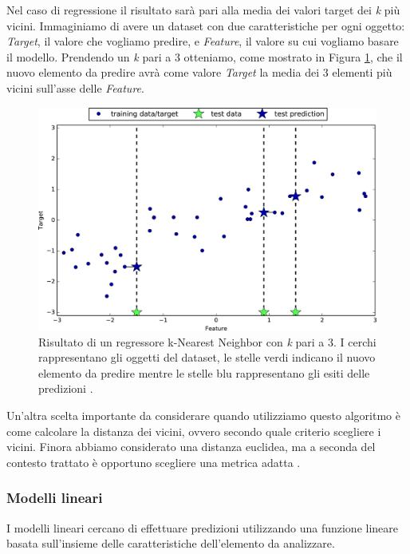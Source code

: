 \documentclass[a4paper,12pt]{report}
\begin{document}
Nel caso di regressione il risultato sarà pari alla media dei valori target dei \textit{k} più vicini. Immaginiamo di avere un dataset con due caratteristiche per ogni oggetto: \textit{Target}, il valore che vogliamo predire, e \textit{Feature}, il valore su cui vogliamo basare il modello. Prendendo un \textit{k} pari a 3 otteniamo, come mostrato in Figura \ref{fig:knearest_regression}, che il nuovo elemento da predire avrà come valore \textit{Target} la media dei 3 elementi più vicini sull'asse delle \textit{Feature}.

\begin{figure}[ht]
    \centering
    \includegraphics[scale = 0.2]{images/knearese_regression_3k.png}
    \caption{Risultato di un regressore k-Nearest Neighbor con \textit{k} pari a 3. I cerchi rappresentano gli oggetti del dataset, le stelle verdi indicano il nuovo elemento da predire mentre le stelle blu rappresentano gli esiti delle predizioni \cite{figure_copyright}.}
    \label{fig:knearest_regression}
\end{figure}

Un'altra scelta importante da considerare quando utilizziamo questo algoritmo è come calcolare la distanza dei vicini, ovvero secondo quale criterio scegliere i vicini. Finora abbiamo considerato una distanza euclidea, ma a seconda del contesto trattato è opportuno scegliere una metrica adatta \cite{distance_metrics_knn}. 

\subsubsection{Modelli lineari}
I modelli lineari cercano di effettuare predizioni utilizzando una funzione lineare basata sull'insieme delle caratteristiche dell'elemento da analizzare.
\end{document}
